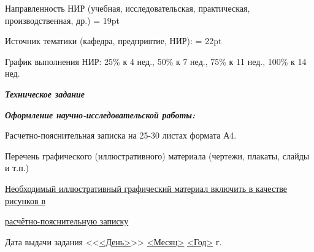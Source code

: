 \documentclass[12pt, left=25mm, right=15mm, top=20mm, bottom=10mm]{templateTaskBMSTU}
\begin{document}
	\begin{flushleft}
		Направленность НИР (учебная, исследовательская, практическая, производственная, др.) \baselineskip = 19pt
		\\ \uline{ \hfill}
	\end{flushleft}

	\begin{flushleft}
		Источник тематики (кафедра, предприятие, НИР): \uline{\hfill} \baselineskip = 22pt
	\end{flushleft}

	\begin{flushleft}
		График выполнения НИР:  25\% к 4 нед., 50\% к 7 нед., 75\% к 11 нед., 100\% к 14 нед.
	\end{flushleft}

	\begin{flushleft}
		\textbf{\textit{Техническое задание}} \uline{\hfill} %
		
		\uline{\hfill}
		
		\uline{\hfill}

		\uline{\hfill}

		\uline{\hfill}
	\end{flushleft}

	\begin{flushleft}
		\textbf{\textit{Оформление научно-исследовательской работы:}}
		
		Расчетно-пояснительная записка на 25-30 %
		листах формата А4.

		Перечень графического (иллюстративного) материала (чертежи, плакаты, слайды и т.п.)
		
		\uline{Необходимый иллюстративный графический материал включить в качестве рисунков в \hfill}

		\uline{расчётно-пояснительную записку\hfill}
	\end{flushleft}

	\begin{flushleft}
		Дата выдачи задания <<\uline{<День>}>> \uline{<Месяц>} \uline{<Год>} г. %
	\end{flushleft}
\end{document}
